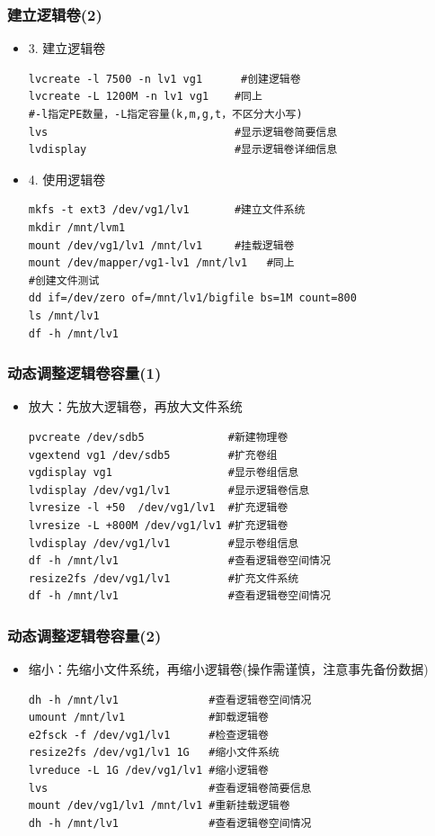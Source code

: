\documentclass[xcolor=svgnames,presentation]{beamer}
\begin{document}
\begin{frame}[fragile]
\frametitle{建立逻辑卷(2)}
\label{sec-5-5}
\begin{itemize}

\item 3. 建立逻辑卷\\
\label{sec-5-5-1}%
\begin{verbatim}
lvcreate -l 7500 -n lv1 vg1      #创建逻辑卷
lvcreate -L 1200M -n lv1 vg1    #同上
#-l指定PE数量，-L指定容量(k,m,g,t，不区分大小写)
lvs                             #显示逻辑卷简要信息
lvdisplay                       #显示逻辑卷详细信息
\end{verbatim}

\item 4. 使用逻辑卷\\
\label{sec-5-5-2}%
\begin{verbatim}
mkfs -t ext3 /dev/vg1/lv1       #建立文件系统
mkdir /mnt/lvm1
mount /dev/vg1/lv1 /mnt/lv1     #挂载逻辑卷
mount /dev/mapper/vg1-lv1 /mnt/lv1   #同上
#创建文件测试
dd if=/dev/zero of=/mnt/lv1/bigfile bs=1M count=800
ls /mnt/lv1
df -h /mnt/lv1
\end{verbatim}
\end{itemize} %
\end{frame}
\begin{frame}[fragile]
\frametitle{动态调整逻辑卷容量(1)}
\label{sec-5-6}
\begin{itemize}

\item 放大：先放大逻辑卷，再放大文件系统\\
\label{sec-5-6-1}%
\begin{verbatim}
pvcreate /dev/sdb5             #新建物理卷
vgextend vg1 /dev/sdb5         #扩充卷组
vgdisplay vg1                  #显示卷组信息
lvdisplay /dev/vg1/lv1         #显示逻辑卷信息
lvresize -l +50  /dev/vg1/lv1  #扩充逻辑卷
lvresize -L +800M /dev/vg1/lv1 #扩充逻辑卷
lvdisplay /dev/vg1/lv1         #显示卷组信息
df -h /mnt/lv1                 #查看逻辑卷空间情况
resize2fs /dev/vg1/lv1         #扩充文件系统
df -h /mnt/lv1                 #查看逻辑卷空间情况
\end{verbatim}
\end{itemize} %
\end{frame}
\begin{frame}[fragile]
\frametitle{动态调整逻辑卷容量(2)}
\label{sec-5-7}
\begin{itemize}

\item 缩小：先缩小文件系统，再缩小逻辑卷(操作需谨慎，注意事先备份数据)\\
\label{sec-5-7-1}%
\begin{verbatim}
dh -h /mnt/lv1              #查看逻辑卷空间情况
umount /mnt/lv1             #卸载逻辑卷
e2fsck -f /dev/vg1/lv1      #检查逻辑卷
resize2fs /dev/vg1/lv1 1G   #缩小文件系统
lvreduce -L 1G /dev/vg1/lv1 #缩小逻辑卷
lvs                         #查看逻辑卷简要信息
mount /dev/vg1/lv1 /mnt/lv1 #重新挂载逻辑卷
dh -h /mnt/lv1              #查看逻辑卷空间情况
\end{verbatim}
\end{itemize} %
\end{frame}
\end{document}
